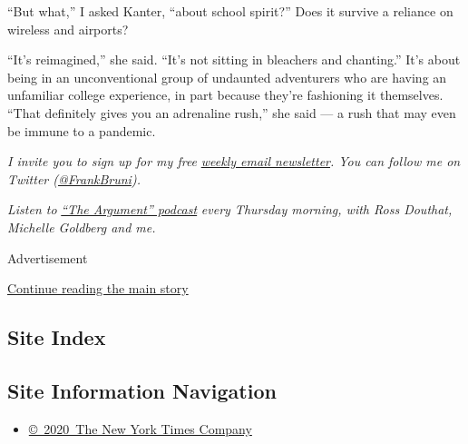 ``But what,'' I asked Kanter, ``about school spirit?'' Does it survive a
reliance on wireless and airports?

``It's reimagined,'' she said. ``It's not sitting in bleachers and
chanting.'' It's about being in an unconventional group of undaunted
adventurers who are having an unfamiliar college experience, in part
because they're fashioning it themselves. ``That definitely gives you an
adrenaline rush,'' she said --- a rush that may even be immune to a
pandemic.

\emph{I invite you to sign up for my free}
\href{https://www.nytimes3xbfgragh.onion/newsletters/frank-bruni}{\emph{weekly
email newsletter}}\emph{. You can follow me on Twitter
(}\href{https://twitter.com/FrankBruni}{\emph{@FrankBruni}}\emph{).}

\emph{Listen to}
\href{https://www.nytimes3xbfgragh.onion/column/the-argument}{\emph{``The
Argument'' podcast}} \emph{every Thursday morning, with Ross Douthat,
Michelle Goldberg and me.}

Advertisement

\protect\hyperlink{after-bottom}{Continue reading the main story}

\hypertarget{site-index}{%
\subsection{Site Index}\label{site-index}}

\hypertarget{site-information-navigation}{%
\subsection{Site Information
Navigation}\label{site-information-navigation}}

\begin{itemize}
\tightlist
\item
  \href{https://help.nytimes3xbfgragh.onion/hc/en-us/articles/115014792127-Copyright-notice}{©~2020~The
  New York Times Company}
\end{itemize}

